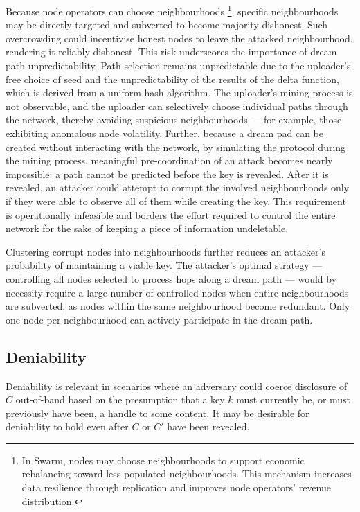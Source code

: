 \documentclass[singlecolumn]{acmart}
\begin{document}
Because node operators can choose neighbourhoods%
%
\footnote{ In Swarm, nodes may  choose neighbourhoods to support economic rebalancing toward less populated neighbourhoods. This mechanism increases data resilience through replication and improves node operators' revenue distribution. }, 
%
specific neighbourhoods may be directly targeted and subverted to become majority dishonest. Such overcrowding could incentivise honest nodes to leave the attacked neighbourhood, rendering it reliably dishonest. This risk underscores the importance of dream path unpredictability. Path selection remains unpredictable due to the uploader's free choice of seed and the unpredictability of the results of the delta function, which is derived from a uniform hash algorithm. The uploader's mining process is not observable, and the uploader can selectively choose individual paths through the network, thereby avoiding suspicious neighbourhoods — for example, those exhibiting anomalous node volatility. Further, because a dream pad can be created without interacting with the network, by simulating the protocol during the mining process, meaningful pre-coordination of an attack becomes nearly impossible: a path cannot be predicted before the key is revealed. After it is revealed, an attacker could attempt to corrupt the involved neighbourhoods only if they were able to observe all of them while creating the key. This requirement is operationally infeasible and borders the effort required to control the entire network for the sake of keeping a piece of information undeletable.

Clustering corrupt nodes into neighbourhoods further reduces an attacker's probability of maintaining a viable key. The attacker's optimal strategy — controlling all nodes selected to process hops along a dream path — would by necessity require a large number of controlled nodes when entire neighbourhoods are subverted, as nodes within the same neighbourhood become redundant. Only one node per neighbourhood can actively participate in the dream path.

\subsection{Deniability}

Deniability is relevant in scenarios where an adversary could coerce disclosure of $C$ out-of-band based on the presumption that a key $k$ must currently be, or must previously have been, a handle to some content. It may be desirable for deniability to hold even after $C$ or $C'$ have been revealed.
\end{document}
